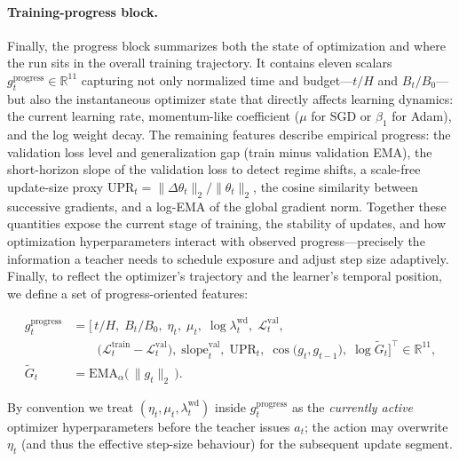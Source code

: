 \documentclass[11pt]{article}
\newcommand{\R}{\mathbb{R}}
\newcommand{\1}{\mathbf{1}}
\begin{document}
\paragraph{Training-progress block.}
Finally, the progress block summarizes both the state of optimization and where the run sits in the overall training trajectory. It contains eleven scalars
\(
g^{\text{progress}}_t\in\R^{11}
\)
capturing not only normalized time and budget---$t/H$ and $B_t/B_0$---but also the instantaneous optimizer state that directly affects learning dynamics: the current learning rate, momentum-like coefficient ($\mu$ for SGD or $\beta_1$ for Adam), and the log weight decay. The remaining features describe empirical progress: the validation loss level and generalization gap (train minus validation EMA), the short-horizon slope of the validation loss to detect regime shifts, a scale-free update-size proxy $\mathrm{UPR}_t=\|\Delta\theta_t\|_2/\|\theta_t\|_2$, the cosine similarity between successive gradients, and a log-EMA of the global gradient norm. Together these quantities expose the current stage of training, the stability of updates, and how optimization hyperparameters interact with observed progress—precisely the information a teacher needs to schedule exposure and adjust step size adaptively. Finally, to reflect the optimizer’s trajectory and the learner’s temporal position, we define a set of progress-oriented features:

\begin{equation}
\label{eq:gprogress-full}
\begin{aligned}
g^{\text{progress}}_t
&= \Big[\,
t/H,\;
B_t/B_0,\;
\eta_t,\;
\mu_t,\;
\log\lambda^{\mathrm{wd}}_t,\;
\mathcal L^{\mathrm{val}}_t,\\[-0.25em]
&\qquad
\big(\mathcal L^{\mathrm{train}}_t-\mathcal L^{\mathrm{val}}_t\big),\;
\mathrm{slope}^{\mathrm{val}}_t,\;
\mathrm{UPR}_t,\;
\cos\!\big(g_t,g_{t-1}\big),\;
\log \widetilde{G}_t
\Big]^{\!\top}\!\in\mathbb{R}^{11},\\[0.25em]
\widetilde{G}_t
&= \mathrm{EMA}_\alpha\!\big(\,\|g_t\|_2\,\big).
\end{aligned}
\end{equation}

By convention we treat $(\eta_t,\mu_t,\lambda^{\mathrm{wd}}_t)$ inside $g^{\text{progress}}_t$ as the \emph{currently active} optimizer hyperparameters before the teacher issues $a_t$; the action may overwrite $\eta_t$ (and thus the effective step-size behaviour) for the subsequent update segment.
\end{document}
